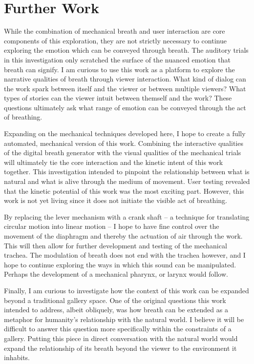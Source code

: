\documentclass[letterpaper]{article}
\begin{document}
\section{Further Work}



While the combination of mechanical breath and user interaction are core components of this exploration, they are not strictly necessary to continue exploring the emotion which can be conveyed through breath. The auditory trials in this investigation only scratched the surface of the nuanced emotion that breath can signify. I am curious to use this work as a platform to explore the narrative qualities of breath through viewer interaction. What kind of dialog can the work spark between itself and the viewer or between multiple viewers? What types of stories can the viewer intuit between themself and the work? These questions ultimately ask what range of emotion can be conveyed through the act of breathing.

Expanding on the mechanical techniques developed here, I hope to create a fully automated, mechanical version of this work. Combining the interactive qualities of the digital breath generator with the visual qualities of the mechanical trials will ultimately tie the core interaction and the kinetic intent of this work together. This investigation intended to pinpoint the relationship between what is natural and what is alive through the medium of movement. User testing revealed that the kinetic potential of this work was the most exciting part. However, this work is not yet living since it does not initiate the visible act of breathing.

By replacing the lever mechanism with a crank shaft -- a technique for translating circular motion into linear motion -- I hope to have fine control over the movement of the diaphragm and thereby the actuation of air through the work. This will then allow for further development and testing of the mechanical trachea. The modulation of breath does not end with the trachea however, and I hope to continue exploring the ways in which this sound can be manipulated. Perhaps the development of a mechanical pharynx, or larynx would follow. 

Finally, I am curious to investigate how the context of this work can be expanded beyond a traditional gallery space. One of the original questions this work intended to address, albeit obliquely, was how breath can be extended as a metaphor for humanity's relationship with the natural world. I believe it will be difficult to answer this question more specifically within the constraints of a gallery. Putting this piece in direct conversation with the natural world would expand the relationship of its breath beyond the viewer to the environment it inhabits. 
\end{document}
